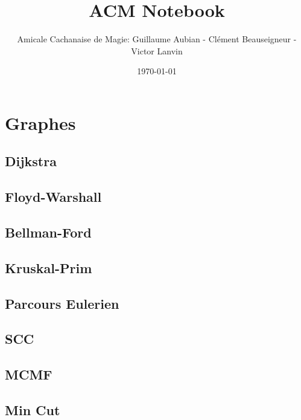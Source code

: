 \documentclass[10pt]{extarticle}
\title{ACM Notebook}
\author{Amicale Cachanaise de Magie: Guillaume Aubian - Clément Beauseigneur - Victor Lanvin}
\date\today
\begin{document}
\maketitle

\tableofcontents


\section{Graphes}
\subsection{Dijkstra}
{\scriptsize}

\subsection{Floyd-Warshall}
{\scriptsize}

\subsection{Bellman-Ford}
{\scriptsize}

\subsection{Kruskal-Prim}
{\scriptsize}

\subsection{Parcours Eulerien}
{\scriptsize}

\subsection{SCC}
{\scriptsize}

\subsection{MCMF}
{\scriptsize}

\subsection{Min Cut}
{\scriptsize}
\end{document}
